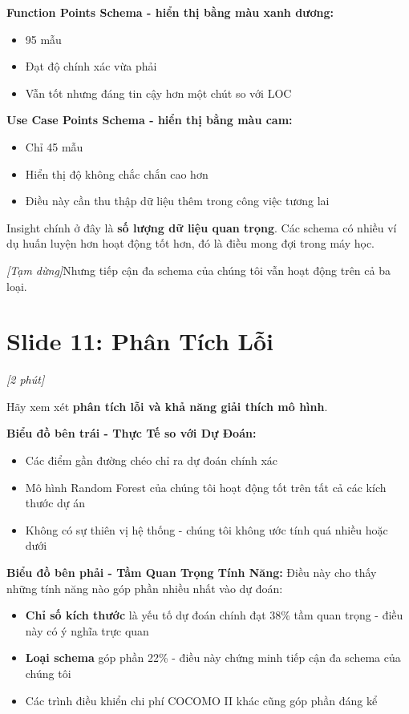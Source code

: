 \documentclass[12pt,a4paper]{article}
\newcommand{\slide}[1]{\section*{\textcolor{slidenum}{Slide #1}}}
\newcommand{\timing}[1]{\textcolor{timing}{\textit{[#1]}}}
\newcommand{\keypoint}[1]{\textcolor{keypoint}{\textbf{#1}}}
\newcommand{\pause}{\textit{[Tạm dừng]}}
\begin{document}
\textbf{Function Points Schema - hiển thị bằng màu xanh dương:}
\begin{itemize}
    \item 95 mẫu
    \item Đạt độ chính xác vừa phải
    \item Vẫn tốt nhưng đáng tin cậy hơn một chút so với LOC
\end{itemize}

\textbf{Use Case Points Schema - hiển thị bằng màu cam:}
\begin{itemize}
    \item Chỉ 45 mẫu
    \item Hiển thị độ không chắc chắn cao hơn
    \item Điều này cần thu thập dữ liệu thêm trong công việc tương lai
\end{itemize}

Insight chính ở đây là \textbf{số lượng dữ liệu quan trọng}. Các schema có nhiều ví dụ huấn luyện hơn hoạt động tốt hơn, đó là điều mong đợi trong máy học.

\pause Nhưng tiếp cận đa schema của chúng tôi vẫn hoạt động trên cả ba loại.

\slide{11: Phân Tích Lỗi}
\timing{2 phút}

Hãy xem xét \keypoint{phân tích lỗi và khả năng giải thích mô hình}.

\textbf{Biểu đồ bên trái - Thực Tế so với Dự Đoán:}
\begin{itemize}
    \item Các điểm gần đường chéo chỉ ra dự đoán chính xác
    \item Mô hình Random Forest của chúng tôi hoạt động tốt trên tất cả các kích thước dự án
    \item Không có sự thiên vị hệ thống - chúng tôi không ước tính quá nhiều hoặc dưới
\end{itemize}

\textbf{Biểu đồ bên phải - Tầm Quan Trọng Tính Năng:}
Điều này cho thấy những tính năng nào góp phần nhiều nhất vào dự đoán:
\begin{itemize}
    \item \textbf{Chỉ số kích thước} là yếu tố dự đoán chính đạt 38\% tầm quan trọng - điều này có ý nghĩa trực quan
    \item \textbf{Loại schema} góp phần 22\% - điều này chứng minh tiếp cận đa schema của chúng tôi
    \item Các trình điều khiển chi phí COCOMO II khác cũng góp phần đáng kể
\end{itemize}
\end{document}
